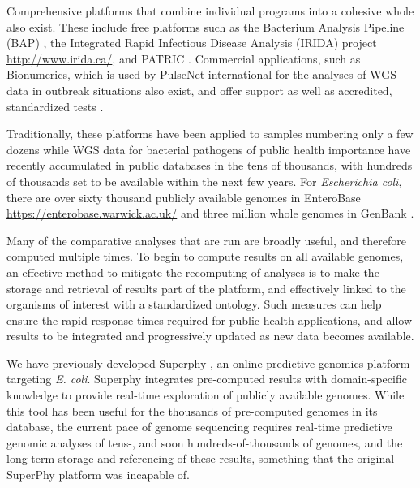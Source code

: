 \documentclass{article}
\begin{document}
Comprehensive platforms that combine individual programs into a cohesive whole also exist. These include free platforms such as the Bacterium Analysis Pipeline (BAP) \cite{thomsen2016bacterial}, the Integrated Rapid Infectious Disease Analysis (IRIDA) project \url{http://www.irida.ca/}, and PATRIC \cite{wattam2013patric}. Commercial applications, such as Bionumerics, which is used by PulseNet international for the analyses of WGS data in outbreak situations also exist, and offer support as well as accredited, standardized tests \cite{swaminathan2001pulsenet}.

Traditionally, these platforms have been applied to samples numbering only a few dozens while WGS data for bacterial pathogens of public health importance have recently accumulated in public databases in the tens of thousands, with hundreds of thousands set to be available within the next few years. For \textit{Escherichia coli}, there are over sixty thousand publicly available genomes in EnteroBase \url{https://enterobase.warwick.ac.uk/} and three million whole genomes in GenBank \cite{doi:10.1093/nar/gks1195}.

Many of the comparative analyses that are run are broadly useful, and therefore computed multiple times. To begin to compute results on all available genomes, an effective method to mitigate the recomputing of analyses is to make the storage and retrieval of results part of the platform, and effectively linked to the organisms of interest with a standardized ontology. Such measures can help ensure the rapid response times required for public health applications, and allow results to be integrated and progressively updated as new data becomes available.

We have previously developed Superphy \cite{whiteside2016superphy}, an online predictive genomics platform targeting \textit{E. coli}. Superphy integrates pre-computed results with domain-specific knowledge to provide real-time exploration of publicly available genomes. While this tool has been useful for the thousands of pre-computed genomes in its database, the current pace of genome sequencing requires real-time predictive genomic analyses of tens-, and soon hundreds-of-thousands of genomes, and the long term storage and referencing of these results, something that the original SuperPhy platform was incapable of.

\end{document}
